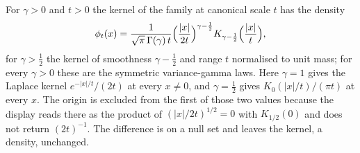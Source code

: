 \begin{proposition}\label{prop:matern-density}
\notready
{}
For $\gamma > 0$ and $t > 0$ the kernel of the \Matern{} family at canonical scale $t$ has the
density
\[
  \phi_t(x) = \frac{1}{\sqrt\pi\,\Gamma(\gamma)\,t}
   \Bigl(\frac{|x|}{2t}\Bigr)^{\gamma - \frac12}
   K_{\gamma-\frac12}\Bigl(\frac{|x|}{t}\Bigr),
\]
for $\gamma > \tfrac12$ the \Matern{} kernel of smoothness $\gamma - \tfrac12$ and range $t$
normalised to unit mass; for every $\gamma > 0$ these are the symmetric variance-gamma laws. Here
$\gamma = 1$ gives the Laplace kernel $e^{-|x|/t}/(2t)$ at every $x \ne 0$, and
$\gamma = \tfrac12$ gives $K_0(|x|/t)/(\pi t)$ at every $x$. The origin is excluded from the first
of those two values because the display reads there as the product of $(|x|/2t)^{1/2} = 0$ with
$K_{1/2}(0)$ and does not return $(2t)^{-1}$. The difference is on a null set and leaves the
kernel, a density, unchanged.

\end{proposition}
